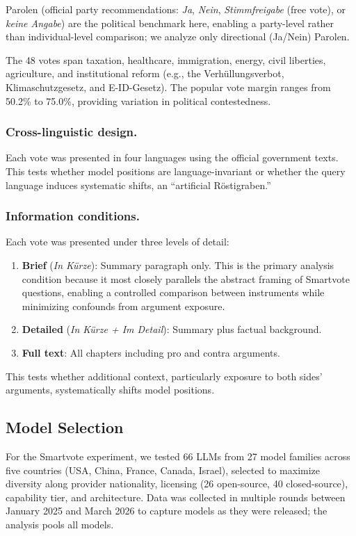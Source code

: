 \documentclass[11pt]{article}
\begin{document}
Parolen (official party recommendations: \emph{Ja}, \emph{Nein}, \emph{Stimmfreigabe} (free vote), or \emph{keine Angabe}) are the political benchmark here, enabling a party-level rather than individual-level comparison; we analyze only directional (Ja/Nein) Parolen.

The 48 votes span taxation, healthcare, immigration, energy, civil liberties, agriculture, and institutional reform (e.g., the Verh\"{u}llungs\-verbot, Klima\-schutz\-gesetz, and E-ID-Gesetz).
The popular vote margin ranges from 50.2\% to 75.0\%, providing variation in political contestedness.

\subsubsection{Cross-linguistic design.}
Each vote was presented in four languages using the official government texts.
This tests whether model positions are language-invariant or whether the query language induces systematic shifts, an ``artificial R\"{o}stigraben.''

\subsubsection{Information conditions.}
Each vote was presented under three levels of detail:
\begin{enumerate}
    \item \textbf{Brief} (\emph{In K\"{u}rze}): Summary paragraph only.
    This is the primary analysis condition because it most closely parallels the abstract framing of Smartvote questions, enabling a controlled comparison between instruments while minimizing confounds from argument exposure.
    \item \textbf{Detailed} (\emph{In K\"{u}rze + Im Detail}): Summary plus factual background.
    \item \textbf{Full text}: All chapters including pro and contra arguments.
\end{enumerate}
This tests whether additional context, particularly exposure to both sides' arguments, systematically shifts model positions.

\subsection{Model Selection}

For the Smartvote experiment, we tested 66 LLMs from 27 model families across five countries (USA, China, France, Canada, Israel), selected to maximize diversity along provider nationality, licensing (26 open-source, 40 closed-source), capability tier, and architecture.
Data was collected in multiple rounds between January 2025 and March 2026 to capture models as they were released; the analysis pools all models.
\end{document}

